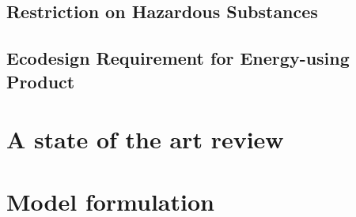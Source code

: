 \documentclass{article}
\begin{document}
\subsection{Restriction on Hazardous Substances}
\subsection{Ecodesign Requirement for Energy-using Product}

\section{A state of the art review}

\section{Model formulation}
\end{document}

